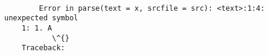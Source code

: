 \documentclass[11pt]{article}
\begin{document}
    \begin{Verbatim}[commandchars=\\\{\}]

        Error in parse(text = x, srcfile = src): <text>:1:4: unexpected symbol
    1: 1. A
           \^{}
    Traceback:


    \end{Verbatim}


    
    
    
    
\end{document}
